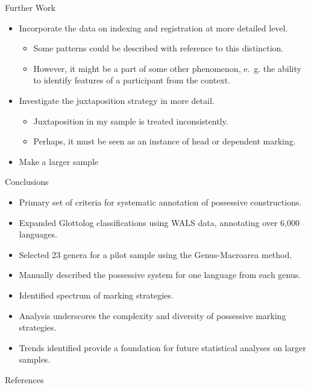 \documentclass[12pt,aspectratio=169,t]{beamer}
\renewcommand{\'}{\textquotesingle}
\begin{document}
\begin{frame}{Further Work}
	\begin{itemize}
		\item Incorporate the data on indexing and registration at more detailed level.
		\begin{itemize}
			\item Some patterns could be described with reference to this distinction.
			\item However, it might be a part of some other phenomenon, e.~g. the ability to identify features of a participant from the context.
		\end{itemize}
		\item Investigate the juxtaposition strategy in more detail.
		\begin{itemize}
			\item Juxtaposition in my sample is treated inconsistently.
			\item Perhaps, it must be seen as an instance of head or dependent marking.
		\end{itemize}
		\item Make a larger sample
	\end{itemize}
\end{frame}

\begin{frame}{Conclusions}
	\small
	\begin{itemize}
		\setlength{\itemsep}{0pt}
		\item Primary set of criteria for systematic annotation of possessive constructions.
		\item Expanded Glottolog classifications using WALS data, annotating over 6,000 languages.
		\item Selected 23 genera for a pilot sample using the Genus-Macroarea method.
		\item Manually described the possessive system for one language from each genus.
		\item Identified spectrum of marking strategies.
		\item Analysis underscores the complexity and diversity of possessive marking strategies.
		\item Trends identified provide a foundation for future statistical analyses on larger samples.
	\end{itemize}
\end{frame}


\begin{frame}[allowframebreaks,t]{References}
    \printbibliography
\end{frame}
\end{document}
